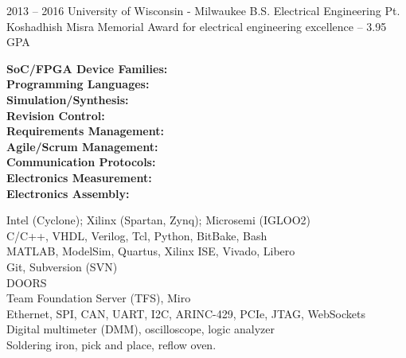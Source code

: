 \documentclass[8pt]{developercv} %
\begin{document}


\begin{entrylist}
	\entry
		{2013 -- 2016}
		{University of Wisconsin - Milwaukee}
		{B.S. Electrical Engineering}
		{Pt. Koshadhish Misra Memorial Award for electrical engineering excellence -- 3.95 GPA}
\end{entrylist}



\begin{minipage}[t]{0.30\textwidth} %
\vspace{-\baselineskip} %
\textbf{SoC/FPGA Device Families:}\\
\textbf{Programming Languages:}\\
\textbf{Simulation/Synthesis:}\\
\textbf{Revision Control:}\\
\textbf{Requirements Management:}\\
\textbf{Agile/Scrum Management:}\\
\textbf{Communication Protocols:}\\
\textbf{Electronics Measurement:}\\
\textbf{Electronics Assembly:}\\
\end{minipage}
\hfill %
\begin{minipage}[t]{0.70\textwidth} %
\vspace{-\baselineskip} %
Intel (Cyclone); Xilinx (Spartan, Zynq); Microsemi (IGLOO2)\\
C/C++, VHDL, Verilog, Tcl, Python, BitBake, Bash\\
MATLAB, ModelSim, Quartus, Xilinx ISE, Vivado, Libero\\
Git, Subversion (SVN)\\
DOORS\\
Team Foundation Server (TFS), Miro\\
Ethernet, SPI, CAN, UART, I2C, ARINC-429, PCIe, JTAG, WebSockets\\
Digital multimeter (DMM), oscilloscope, logic analyzer\\
Soldering iron, pick and place, reflow oven.\\
\end{minipage}


\end{document}

